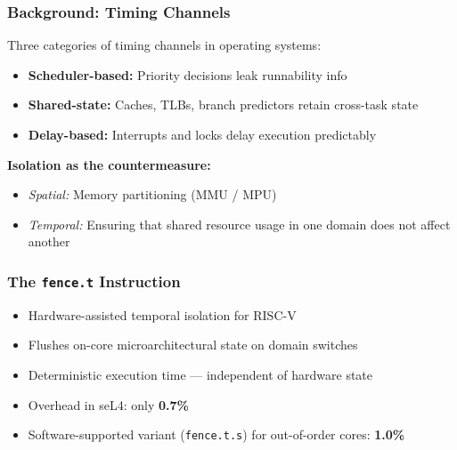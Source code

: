 \begin{frame}
\frametitle{Background: Timing Channels}

Three categories of timing channels in operating systems:

\vspace{0.3cm}
\begin{itemize}
  \item \textbf{Scheduler-based:} Priority decisions leak runnability info
  \item \textbf{Shared-state:} Caches, TLBs, branch predictors retain cross-task state
  \item \textbf{Delay-based:} Interrupts and locks delay execution predictably
\end{itemize}

\vspace{0.3cm}
\textbf{Isolation as the countermeasure:}
\begin{itemize}
  \item \textit{Spatial:} Memory partitioning (MMU / MPU)
  \item \textit{Temporal:} Ensuring that shared resource usage in one domain does not affect another
\end{itemize}

\end{frame}

\begin{frame}
\frametitle{The \texttt{fence.t} Instruction}

\begin{itemize}
  \item Hardware-assisted temporal isolation for RISC-V
  \item Flushes on-core microarchitectural state on domain switches
  \item Deterministic execution time --- independent of hardware state
  \item Overhead in seL4: only \textbf{0.7\%}
  \item Software-supported variant (\texttt{fence.t.s}) for out-of-order cores: \textbf{1.0\%}
\end{itemize}

\tiny{}

\end{frame}
